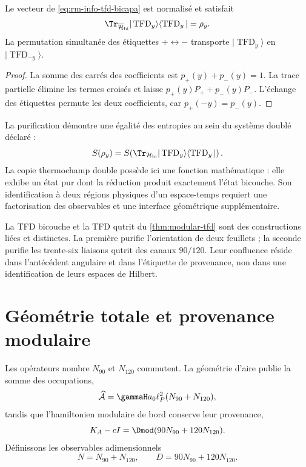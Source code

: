 \begin{proposition}
\label{prop:rm-info-tfd-bicapa}
Le vecteur de \cref{eq:rm-info-tfd-bicapa} est normalisé et satisfait
\begin{equation}
 \Tr_{\overline{\mathcal H}_{\rm bi}}
 |\operatorname{TFD}_y\rangle
 \langle\operatorname{TFD}_y|
 =\rho_y.
 \label{eq:rm-info-tfd-partial}
\end{equation}
La permutation simultanée des étiquettes \(+\leftrightarrow-\)
transporte \(|\operatorname{TFD}_y\rangle\) en
\(|\operatorname{TFD}_{-y}\rangle\).
\end{proposition}

\begin{proof}
La somme des carrés des coefficients est
\(p_+(y)+p_-(y)=1\). La trace partielle élimine les termes croisés et
laisse \(p_+(y)P_++p_-(y)P_-\). L'échange des étiquettes permute
les deux coefficients, car \(p_+(-y)=p_-(y)\).
\end{proof}

La purification démontre une égalité des entropies au sein du système
doublé déclaré :
\begin{equation}
 S(\rho_y)
 =S\!\left(
 \Tr_{\mathcal H_{\rm bi}}
 |\operatorname{TFD}_y\rangle
 \langle\operatorname{TFD}_y|
 \right).
 \label{eq:rm-info-tfd-entropy}
\end{equation}
La copie thermochamp double possède ici une fonction mathématique : elle exhibe un
état pur dont la réduction produit exactement l'état bicouche. Son
identification à deux régions physiques d'un espace-temps requiert
une factorisation des observables et une interface géométrique supplémentaire.

La TFD bicouche et la TFD qutrit du
\cref{thm:modular-tfd} sont des constructions liées et distinctes. La
première purifie l'orientation de deux feuillets ; la seconde purifie les
trente-six liaisons qutrit des canaux \(90/120\). Leur confluence
réside dans l'antécédent angulaire et dans l'étiquette de
provenance, non dans une identification de leurs espaces de Hilbert.

\section{Géométrie totale et provenance modulaire}

Les opérateurs nombre \(N_{90}\) et \(N_{120}\) commutent. La géométrie
d'aire publie la somme des occupations,
\begin{equation}
 \widehat{\mathcal A}
 =\gammaH a_0\ell_P^2(N_{90}+N_{120}),
 \label{eq:rm-info-area-total}
\end{equation}
tandis que l'hamiltonien modulaire de bord conserve leur provenance,
\begin{equation}
 K_A-cI
 =\Dmod(90N_{90}+120N_{120}).
 \label{eq:rm-info-hhm-provenance}
\end{equation}
Définissons les observables adimensionnels
\begin{equation}
 N=N_{90}+N_{120},
 \qquad
 D=90N_{90}+120N_{120}.
 \label{eq:rm-info-ND}
\end{equation}

